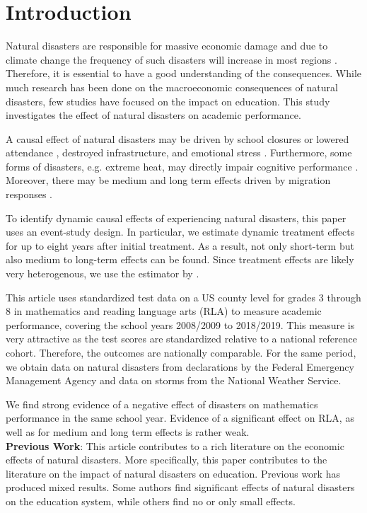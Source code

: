 
\section{Introduction}

Natural disasters are responsible for massive economic damage and due to climate change the frequency of such disasters will increase in most regions \citep{IPCC_2021}. Therefore, it is essential to have a good understanding of the consequences. While much research has been done on the macroeconomic consequences of natural disasters, few studies have focused on the impact on education. This study investigates the effect of natural disasters on academic performance.

A causal effect of natural disasters may be driven by school closures \citep{Grewening_2020} or lowered attendance \citep{Spencer_2016}, destroyed infrastructure, and emotional stress \citep{Vogel_2016}. Furthermore, some forms of disasters, e.g. extreme heat, may directly impair cognitive performance \citep{Ramsey_1995}. Moreover, there may be medium and long term effects driven by migration responses \citep{Boustan_2020, Sacerdote_2012}.

To identify dynamic causal effects of experiencing natural disasters, this paper uses an event-study design. In particular, we estimate dynamic treatment effects for up to eight years after initial treatment. As a result, not only short-term but also medium to long-term effects can be found. Since treatment effects are likely very heterogenous, we use the estimator by \cite{Sun_2021}. 

This article uses standardized test data on a US county level for grades 3 through 8 in mathematics and reading language arts (RLA) to measure academic performance, covering the school years 2008/2009 to 2018/2019. This measure is very attractive as the test scores are standardized relative to a national reference cohort. Therefore, the outcomes are nationally comparable. For the same period, we obtain data on natural disasters from declarations by the Federal Emergency Management Agency and data on storms from the National Weather Service.

We find strong evidence of a negative effect of disasters on mathematics performance in the same school year. Evidence of a significant effect on RLA, as well as for medium and long term effects is rather weak.
\\

\textbf{Previous Work}: This article contributes to a rich literature on the economic effects of natural disasters. More specifically, this paper contributes to the literature on the impact of natural disasters on education. Previous work has produced mixed results. Some authors find significant effects of natural disasters on the education system, while others find no or only small effects.

